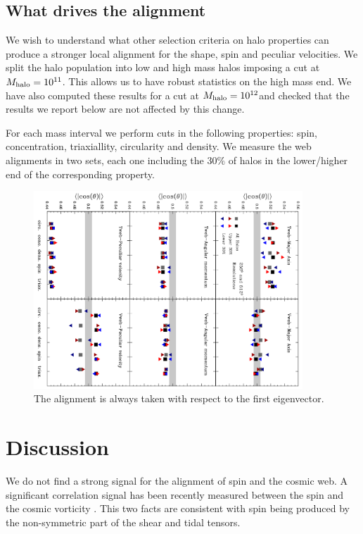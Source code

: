 \documentclass[usenatbib]{mn2e}
\newcommand{\hMsun}{{\ifmmode{h^{-1}{\rm
        {M_{\odot}}}}\else{$h^{-1}{\rm{M_{\odot}}}$}\fi}}
\begin{document}
\subsection{What drives the alignment}

We wish to understand what other selection criteria on halo
properties can produce a stronger local alignment for the shape, spin
and peculiar velocities. We split the halo population into low and
high mass halos imposing a cut at $M_{\rm halo}=10^{11}$\hMsun. This
allows us to have robust statistics on the high mass end. We have also
computed these results for a cut at $M_{\rm halo}=10^{12}$\hMsun and
checked that the results we report below are not affected by this
change.

For each mass interval we perform cuts in the following properties:
spin, concentration, triaxiallity, circularity  and density. We
measure the web alignments in two sets, each one including the $30\%$
of halos in the lower/higher end of the corresponding property.


\begin{figure}
\includegraphics[width=0.90\textwidth,angle=90]{all_cuts.pdf}
\caption{The alignment is always taken with respect to the first eigenvector.}
\end{figure}
\section{Discussion}
\label{sec:discussion}


We do not find a strong signal for the alignment of spin and the
cosmic web. A significant correlation signal has been recently
measured between the spin and the cosmic vorticity
\citep{Libeskind2013a,Laigle2013}. This two facts are consistent with
spin being produced by the non-symmetric part of the shear and tidal
tensors.  
\end{document}
